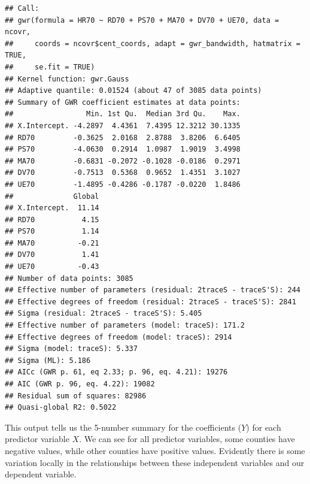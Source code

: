 \documentclass[
  krantz2]{krantz}
\makeatletter
\newenvironment{Shaded}{\begin{snugshade}}{\end{snugshade}}
\newcommand{\AttributeTok}[1]{\textcolor[rgb]{0.61,0.61,0.61}{#1}}
\newcommand{\ConstantTok}[1]{\textcolor[rgb]{0,0,0}{#1}}
\newcommand{\FunctionTok}[1]{\textcolor[rgb]{0,0,0}{#1}}
\newcommand{\NormalTok}[1]{#1}
\newcommand{\OtherTok}[1]{\textcolor[rgb]{0.37,0.37,0.37}{#1}}
\newcommand{\SpecialCharTok}[1]{\textcolor[rgb]{0,0,0}{#1}}
\newenvironment{kframe}{%
\medskip{}
\setlength{\fboxsep}{.8em}
 \def\at@end@of@kframe{}%
 \ifinner\ifhmode%
  \def\at@end@of@kframe{\end{minipage}}%
  \begin{minipage}{\columnwidth}%
 \fi\fi%
 \def\FrameCommand##1{\hskip\@totalleftmargin \hskip-\fboxsep
 \colorbox{shadecolor}{##1}\hskip-\fboxsep
     \hskip-\linewidth \hskip-\@totalleftmargin \hskip\columnwidth}%
 \MakeFramed {\advance\hsize-\width
   \@totalleftmargin\z@ \linewidth\hsize
   \@setminipage}}%
 {\par\unskip\endMakeFramed%
 \at@end@of@kframe}
\renewenvironment{Shaded}{\begin{kframe}}{\end{kframe}}
\makeatother
\begin{document}
\begin{Shaded}
\end{Shaded}

\begin{verbatim}
## Call:
## gwr(formula = HR70 ~ RD70 + PS70 + MA70 + DV70 + UE70, data = ncovr, 
##     coords = ncovr$cent_coords, adapt = gwr_bandwidth, hatmatrix = TRUE, 
##     se.fit = TRUE)
## Kernel function: gwr.Gauss 
## Adaptive quantile: 0.01524 (about 47 of 3085 data points)
## Summary of GWR coefficient estimates at data points:
##                 Min. 1st Qu.  Median 3rd Qu.    Max.
## X.Intercept. -4.2897  4.4361  7.4395 12.3212 30.1335
## RD70         -0.3625  2.0168  2.8788  3.8206  6.6405
## PS70         -4.0630  0.2914  1.0987  1.9019  3.4998
## MA70         -0.6831 -0.2072 -0.1028 -0.0186  0.2971
## DV70         -0.7513  0.5368  0.9652  1.4351  3.1027
## UE70         -1.4895 -0.4286 -0.1787 -0.0220  1.8486
##              Global
## X.Intercept.  11.14
## RD70           4.15
## PS70           1.14
## MA70          -0.21
## DV70           1.41
## UE70          -0.43
## Number of data points: 3085 
## Effective number of parameters (residual: 2traceS - traceS'S): 244 
## Effective degrees of freedom (residual: 2traceS - traceS'S): 2841 
## Sigma (residual: 2traceS - traceS'S): 5.405 
## Effective number of parameters (model: traceS): 171.2 
## Effective degrees of freedom (model: traceS): 2914 
## Sigma (model: traceS): 5.337 
## Sigma (ML): 5.186 
## AICc (GWR p. 61, eq 2.33; p. 96, eq. 4.21): 19276 
## AIC (GWR p. 96, eq. 4.22): 19082 
## Residual sum of squares: 82986 
## Quasi-global R2: 0.5022
\end{verbatim}

This output tells us the 5-number summary for the coefficients (\(Y\)) for each predictor variable \(X\). We can see for all predictor variables, some counties have negative values, while other counties have positive values. Evidently there is some variation locally in the relationships between these independent variables and our dependent variable.
\end{document}
